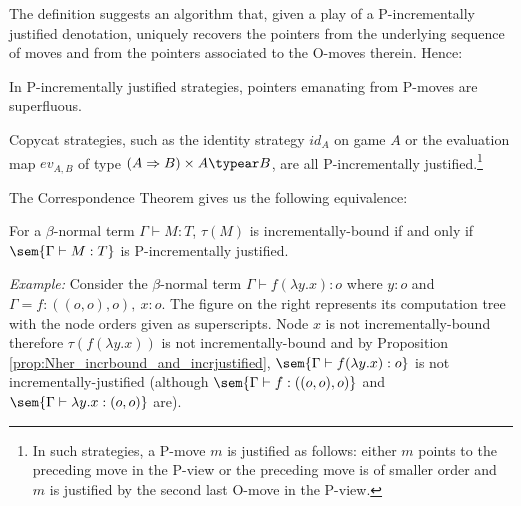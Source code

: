 The definition suggests an algorithm that, given a play of a
P-incrementally justified denotation, uniquely recovers the pointers
from the underlying sequence of moves and from the pointers
associated to the O-moves therein. Hence:
\begin{lemma}
\label{lem:incrjustified_pointers_uniqu_recover} In P-incrementally
justified strategies, pointers emanating from P-moves are
superfluous.
\end{lemma}

\begin{example}
Copycat strategies, such as the identity strategy $id_A$ on game $A$
or the evaluation map $ev_{A,B}$ of type $(A \Rightarrow B) \times A
\typear B$, are all P-incrementally justified.\footnote{In such
strategies, a P-move $m$ is justified as follows: either $m$ points
to the preceding move in the P-view or the preceding move is of
smaller order and $m$ is justified by the second last O-move in the
P-view.}
\end{example}
%



The Correspondence Theorem
gives us the following equivalence:
\begin{proposition} %
\label{prop:Nher_incrbound_and_incrjustified} For a $\beta$-normal
term $\Gamma \vdash M : T$, $\tau(M)$ is incrementally-bound if and
only if $\sem{\Gamma \vdash M : T}$ is P-incrementally justified.
\end{proposition}


\noindent \emph{Example:} %
Consider the $\beta$-normal term $\Gamma\vdash f (\lambda y .x) : o$
where $y:o$ and $\Gamma =f:((o,o),o),~x:o$. The figure on the right
represents its computation tree with the node orders given as
superscripts.  Node $x$ is not incrementally-bound therefore $\tau(f
(\lambda y .x))$ is not incrementally-bound and by Proposition
\ref{prop:Nher_incrbound_and_incrjustified}, $\sem{\Gamma \vdash f
(\lambda y .x) : o}$ is not incrementally-justified (although
$\sem{\Gamma \vdash f : ((o,o),o)}$ and $\sem{\Gamma \vdash \lambda
  y. x : (o,o)}$ are).
\smallskip

